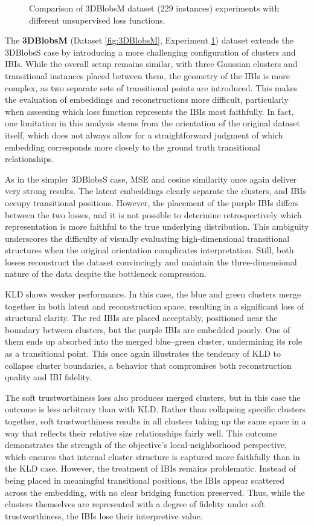 \begin{figure}[htbp]
  \caption{Comparison of 3DBlobsM dataset (229 instances) experiments with different unsupervised loss functions.}
  \label{fig:RQ2/3DBlobsM}
\end{figure}

The \textbf{3DBlobsM} (Dataset \ref{fig:3DBlobsM}, Experiment \ref{fig:RQ2/3DBlobsM}) dataset extends the 3DBlobsS case by introducing a more challenging configuration of clusters and IBIs. While the overall setup remains similar, with three Gaussian clusters and transitional instances placed between them, the geometry of the IBIs is more complex, as two separate sets of transitional points are introduced. This makes the evaluation of embeddings and reconstructions more difficult, particularly when assessing which loss function represents the IBIs most faithfully. In fact, one limitation in this analysis stems from the orientation of the original dataset itself, which does not always allow for a straightforward judgment of which embedding corresponds more closely to the ground truth transitional relationships.

As in the simpler 3DBlobsS case, MSE and cosine similarity once again deliver very strong results. The latent embeddings clearly separate the clusters, and IBIs occupy transitional positions. However, the placement of the purple IBIs differs between the two losses, and it is not possible to determine retrospectively which representation is more faithful to the true underlying distribution. This ambiguity underscores the difficulty of visually evaluating high-dimensional transitional structures when the original orientation complicates interpretation. Still, both losses reconstruct the dataset convincingly and maintain the three-dimensional nature of the data despite the bottleneck compression.

KLD shows weaker performance. In this case, the blue and green clusters merge together in both latent and reconstruction space, resulting in a significant loss of structural clarity. The red IBIs are placed acceptably, positioned near the boundary between clusters, but the purple IBIs are embedded poorly. One of them ends up absorbed into the merged blue–green cluster, undermining its role as a transitional point. This once again illustrates the tendency of KLD to collapse cluster boundaries, a behavior that compromises both reconstruction quality and IBI fidelity.

The soft trustworthiness loss also produces merged clusters, but in this case the outcome is less arbitrary than with KLD. Rather than collapsing specific clusters together, soft trustworthiness results in all clusters taking up the same space in a way that reflects their relative size relationships fairly well. This outcome demonstrates the strength of the objective’s local-neighborhood perspective, which ensures that internal cluster structure is captured more faithfully than in the KLD case. However, the treatment of IBIs remains problematic. Instead of being placed in meaningful transitional positions, the IBIs appear scattered across the embedding, with no clear bridging function preserved. Thus, while the clusters themselves are represented with a degree of fidelity under soft trustworthiness, the IBIs lose their interpretive value.


